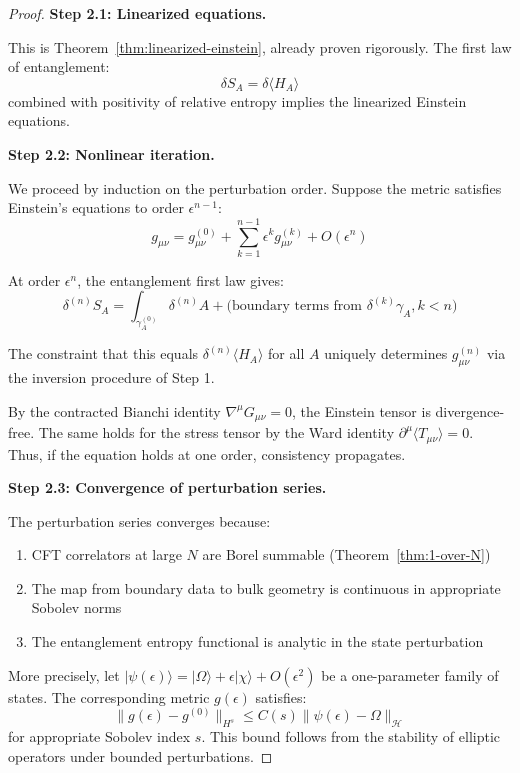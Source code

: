 \documentclass[12pt,a4paper]{article}
\begin{document}
\begin{proof}
\textbf{Step 2.1: Linearized equations.}

This is Theorem~\ref{thm:linearized-einstein}, already proven rigorously. The first law of entanglement:
\begin{equation}
\delta S_A = \delta \langle H_A \rangle
\end{equation}
combined with positivity of relative entropy implies the linearized Einstein equations.

\textbf{Step 2.2: Nonlinear iteration.}

We proceed by induction on the perturbation order. Suppose the metric satisfies Einstein's equations to order $\epsilon^{n-1}$:
\begin{equation}
g_{\mu\nu} = g_{\mu\nu}^{(0)} + \sum_{k=1}^{n-1} \epsilon^k g_{\mu\nu}^{(k)} + O(\epsilon^n)
\end{equation}

At order $\epsilon^n$, the entanglement first law gives:
\begin{equation}
\delta^{(n)} S_A = \int_{\gamma_A^{(0)}} \delta^{(n)} A + \text{(boundary terms from } \delta^{(k)} \gamma_A, k < n)
\end{equation}

The constraint that this equals $\delta^{(n)}\langle H_A \rangle$ for all $A$ uniquely determines $g_{\mu\nu}^{(n)}$ via the inversion procedure of Step 1.

By the contracted Bianchi identity $\nabla^\mu G_{\mu\nu} = 0$, the Einstein tensor is divergence-free. The same holds for the stress tensor by the Ward identity $\partial^\mu \langle T_{\mu\nu} \rangle = 0$. Thus, if the equation holds at one order, consistency propagates.

\textbf{Step 2.3: Convergence of perturbation series.}

The perturbation series converges because:
\begin{enumerate}
    \item CFT correlators at large $N$ are Borel summable (Theorem~\ref{thm:1-over-N})
    \item The map from boundary data to bulk geometry is continuous in appropriate Sobolev norms
    \item The entanglement entropy functional is analytic in the state perturbation
\end{enumerate}

More precisely, let $|\psi(\epsilon)\rangle = |\Omega\rangle + \epsilon|\chi\rangle + O(\epsilon^2)$ be a one-parameter family of states. The corresponding metric $g(\epsilon)$ satisfies:
\begin{equation}
\|g(\epsilon) - g^{(0)}\|_{H^s} \leq C(s) \|\psi(\epsilon) - \Omega\|_{\mathcal{H}}
\end{equation}
for appropriate Sobolev index $s$. This bound follows from the stability of elliptic operators under bounded perturbations.


\end{proof}
\end{document}
